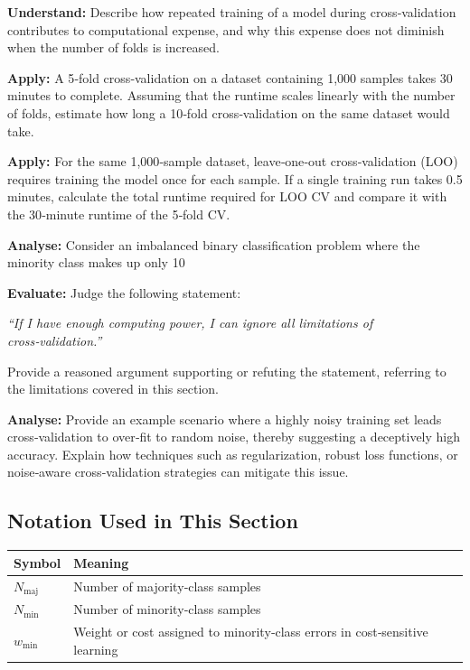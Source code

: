 \documentclass[12pt, a4paper]{article}
\begin{document}
\newpage
\textbf{Understand:}  
Describe how repeated training of a model during cross‑validation contributes to computational expense, and why this expense does not diminish when the number of folds is increased.

\newpage
\textbf{Apply:}  
A 5‑fold cross‑validation on a dataset containing 1,000 samples takes 30 minutes to complete. Assuming that the runtime scales linearly with the number of folds, estimate how long a 10‑fold cross‑validation on the same dataset would take.

\newpage
\textbf{Apply:}  
For the same 1,000‑sample dataset, leave‑one‑out cross‑validation (LOO) requires training the model once for each sample.  
If a single training run takes 0.5 minutes, calculate the total runtime required for LOO CV and compare it with the 30‑minute runtime of the 5‑fold CV.

\newpage
\textbf{Analyse:}  
Consider an imbalanced binary classification problem where the minority class makes up only 10 %

\newpage
\textbf{Evaluate:}  
Judge the following statement:  

\emph{“If I have enough computing power, I can ignore all limitations of cross‑validation.”}  

Provide a reasoned argument supporting or refuting the statement, referring to the limitations covered in this section.

\newpage
\textbf{Analyse:}  
Provide an example scenario where a highly noisy training set leads cross‑validation to over‑fit to random noise, thereby suggesting a deceptively high accuracy. Explain how techniques such as regularization, robust loss functions, or noise‑aware cross‑validation strategies can mitigate this issue.

\newpage

\subsection*{Notation Used in This Section}
\begin{tabular}{@{}ll@{}}
\toprule
Symbol & Meaning \\ \midrule
    $N_{\text{maj}}$ & Number of majority‑class samples \\
    $N_{\text{min}}$ & Number of minority‑class samples \\
    $w_{\text{min}}$ & Weight or cost assigned to minority‑class errors in cost‑sensitive learning \\
\bottomrule
\end{tabular}
\vspace{1em}
\end{document}
